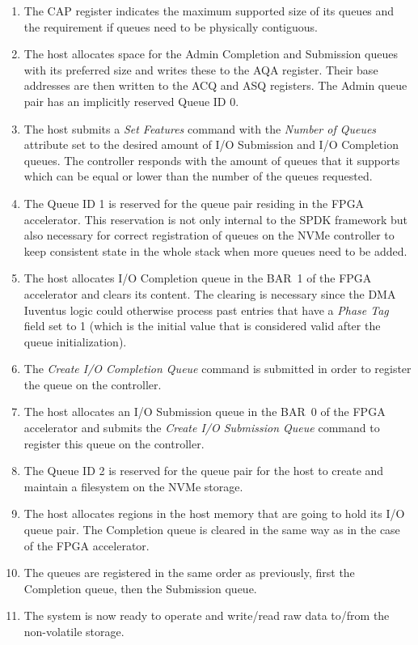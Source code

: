 \begin{enumerate}
    \item The \ac{CAP} register indicates the maximum supported size of its queues and the
    requirement if queues need to be physically contiguous.
    \item The host allocates space for the Admin Completion and Submission queues with its preferred
    size and writes these to the \ac{AQA} register. Their base addresses are then written to the
    \ac{ACQ} and \ac{ASQ} registers. The Admin queue pair has an implicitly reserved Queue ID 0.
    \item The host submits a \emph{Set Features} command with the \emph{Number of Queues} attribute
    set to the desired amount of I/O Submission and I/O Completion queues. The controller responds
    with the amount of queues that it supports which can be equal or lower than the number of the
    queues requested.
    \item The Queue ID 1 is reserved for the queue pair residing in the FPGA accelerator. This
    reservation is not only internal to the SPDK framework but also necessary for correct
    registration of queues on the NVMe controller to keep consistent state in the whole stack
    when more queues need to be added\footnotemark.
    \item The host allocates I/O Completion queue in the BAR~1 of the FPGA accelerator and clears
    its content. The clearing is necessary since the DMA Iuventus logic could otherwise process past
    entries that have a \emph{Phase Tag} field set to 1 (which is the initial value that is
    considered valid after the queue initialization).
    \item The \emph{Create I/O Completion Queue} command is submitted in order to register the
    queue on the controller.
    \item The host allocates an I/O Submission queue in the BAR~0 of the FPGA accelerator and
    submits the \emph{Create I/O Submission Queue} command to register this queue on the controller.
    \item The Queue ID 2 is reserved for the queue pair for the host to create and maintain a
    filesystem on the NVMe storage.
    \item The host allocates regions in the host memory that are going to hold its I/O queue pair.
    The Completion queue is cleared in the same way as in the case of the FPGA accelerator.
    \item The queues are registered in the same order as previously, first the Completion queue,
    then the Submission queue.
    \item The system is now ready to operate and write/read raw data to/from the non-volatile
    storage.
\end{enumerate}

